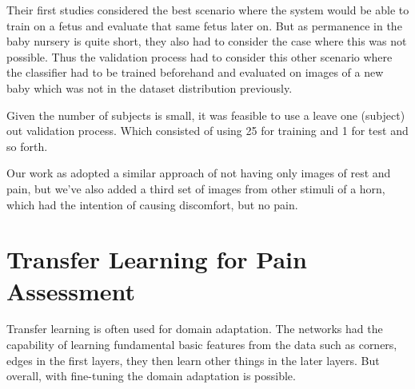 Their first studies considered the best scenario where the system would be able to train on a fetus and evaluate that same fetus later on. But as permanence in the baby nursery is quite short, they also had to consider the case where this was not possible. Thus the validation process had to consider this other scenario where the classifier had to be trained beforehand and evaluated on images of a new baby which was not in the dataset distribution previously.

Given the number of subjects is small, it was feasible to use a leave one (subject) out validation process. Which consisted of using 25 for training and 1 for test and so forth.

Our work as adopted a similar approach of not having only images of rest and pain, but we've also added a third set of images from other stimuli of a horn, which had the intention of causing discomfort, but no pain. 

\section{Transfer Learning for Pain Assessment}

Transfer learning is often used for domain adaptation. The networks had the capability of learning fundamental basic features from the data such as corners, edges in the first layers, they then learn other things in the later layers. But overall, with fine-tuning the domain adaptation is possible.